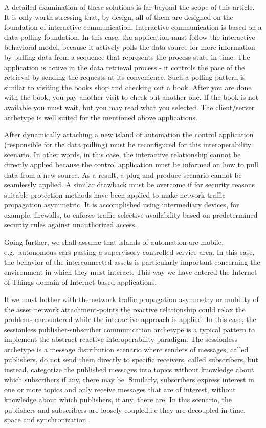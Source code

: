 \documentclass{jacsart}
\begin{document}
A detailed examination of these solutions is far beyond the scope of
this article. It is only worth stressing that, by design, all of them
are designed on the foundation of interactive communication. Interactive
communication is based on a data polling foundation. In this case, the
application must follow the interactive behavioral model, because it
actively polls the data source for more information by pulling data from
a sequence that represents the process state in time. The application is
active in the data retrieval process - it controls the pace of the
retrieval by sending the requests at its convenience. Such a polling
pattern is similar to visiting the books shop and checking out a book.
After you are done with the book, you pay another visit to check out
another one. If the book is not available you must wait, but you may
read what you selected. The client/server archetype is well suited for
the mentioned above applications.

After dynamically attaching a new island of automation the control
application (responsible for the data pulling) must be reconfigured for
this interoperability scenario. In other words, in this case, the
interactive relationship cannot be directly applied because the control
application must be informed on how to pull data from a new source. As a
result, a plug and produce scenario cannot be seamlessly applied. A
similar drawback must be overcome if for security reasons suitable
protection methods have been applied to make network traffic propagation
asymmetric. It is accomplished using intermediary devices, for example,
firewalls, to enforce traffic selective availability based on
predetermined security rules against unauthorized access.

Going further, we shall assume that islands of automation are mobile,
e.g.~autonomous cars passing a supervisory controlled service area. In
this case, the behavior of the interconnected assets is particularly
important concerning the environment in which they must interact. This
way we have entered the Internet of Things domain of Internet-based
applications.

If we must bother with the network traffic propagation asymmetry or
mobility of the asset network attachment-points the reactive
relationship could relax the problems encountered while the interactive
approach is applied. In this case, the sessionless publisher-subscriber
communication archetype is a typical pattern to implement the abstract
reactive interoperability paradigm. The sessionless archetype is a
message distribution scenario where senders of messages, called
publishers, do not send them directly to specific receivers, called
subscribers, but instead, categorize the published messages into topics
without knowledge about which subscribers if any, there may be.
Similarly, subscribers express interest in one or more topics and only
receive messages that are of interest, without knowledge about which
publishers, if any, there are. In this scenario, the publishers and
subscribers are loosely coupled.i.e they are decoupled in time, space
and synchronization \cite{RefWorks:doc:5c44e246e4b0591b15ea9e59}.
\end{document}
